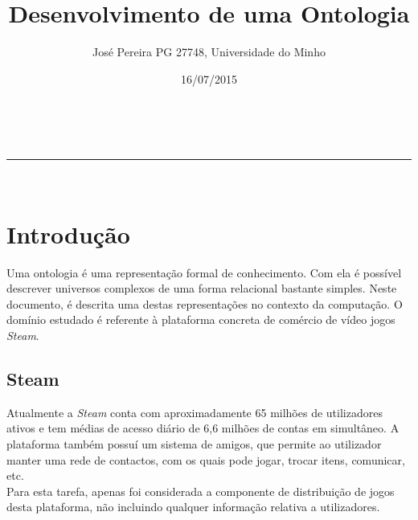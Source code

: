 \documentclass[a4paper,11pt]{article}
\makeatletter
\newcommand{\linia}{\rule{\linewidth}{0.5pt}}
\theoremstyle{mytheor}
\renewcommand{\maketitle}{
\begin{center}
\vspace{2ex}
{\huge \textsc{\@title}}
\vspace{1ex}
\\
\linia\\
\@author \hfill \@date
\vspace{4ex}
\end{center}
}
\makeatother
\begin{document}
\title{Desenvolvimento de uma Ontologia }

\author{José Pereira PG 27748, Universidade do Minho}

\date{16/07/2015}

\maketitle

\section*{Introdução}
Uma ontologia é uma representação formal de conhecimento. Com ela é possível descrever universos complexos de uma forma relacional bastante simples. Neste documento, é descrita uma destas representações no contexto da computação. O domínio estudado é referente à plataforma concreta de comércio de vídeo jogos \textit{Steam}.
\subsection{Steam}
Atualmente a \textit{Steam} conta com aproximadamente 65 milhões de utilizadores ativos e tem médias de acesso diário de 6,6 milhões de contas em simultâneo. A plataforma também possuí um sistema de amigos, que permite ao utilizador manter uma rede de contactos, com os quais pode jogar, trocar itens, comunicar, etc.\\
Para esta tarefa, apenas foi considerada a componente de distribuição de jogos desta plataforma, não incluindo qualquer informação relativa a utilizadores.
\end{document}
